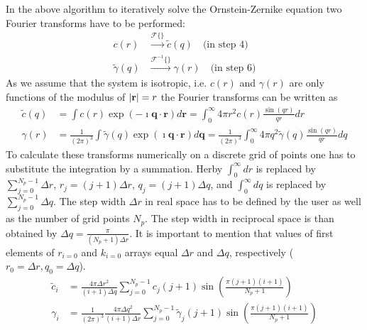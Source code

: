 
In the above algorithm to iteratively solve the Ornstein-Zernike
equation two Fourier transforms have to be performed:
\begin{align}
c(r) & \xrightarrow{\mathscr{F}\{\}} \tilde{c}(q)  \quad \mbox{(in step 4)} \\
\tilde{\gamma}(q) & \xrightarrow{\mathscr{F}^{-1}\{\}} \gamma(r) \quad \mbox{(in step 6)}
\end{align}
As we assume that the system is isotropic, i.e. $c(r)$ and $\gamma(r)$ are only functions
of the modulus of $\abs{\mathbf{r}}=r$ the Fourier transforms can be written as
\begin{align}
\tilde{c}(q) &= \int c(r) \exp\left(- \imath\mathbf{q}\cdot \mathbf{r} \right) d\mathbf{r}
              = \int_0^\infty 4\pi r^2 c(r)              \frac{\sin(qr)}{qr}  dr \\
\gamma(r)    &= \frac{1}{(2\pi)^3}
                \int \tilde{\gamma}(q) \exp\left(\imath\mathbf{q}\cdot \mathbf{r}\right) d\mathbf{q}
              = \frac{1}{(2\pi)^3}
                \int_0^\infty 4\pi q^2 \tilde{\gamma}(q) \frac{\sin(qr)}{qr}  dq
\end{align}
To calculate these transforms numerically on a discrete grid of points
one has to substitute the integration by a summation. Herby $\int_0^\infty dr$ is replaced by
$\sum_{j=0}^{N_p-1} \Delta r$, $r_j=(j+1)\Delta r$, $q_j=(j+1)\Delta q$, and $\int_0^\infty dq$ is replaced by
$\sum_{j=0}^{N_p-1} \Delta q$. The step width $\Delta r$ in real space has to be defined by the user as well
as the number of grid points $N_p$. The step width in reciprocal space is than obtained by
$\Delta q=\frac{\pi}{(N_p+1)\Delta r}$.
It is important to mention that values of first elements of $r_{i=0}$ and $k_{i=0}$ arrays equal $\Delta r$
and $\Delta q$, respectively ($r_0=\Delta r, q_0=\Delta q$).
\begin{align}
\tilde{c}_i &=                   \frac{4\pi \Delta r^2}{(i+1)\Delta q} \sum_{j=0}^{N_p-1}              c_j (j+1) \sin\left(\frac{\pi(j+1)(i+1)}{N_p+1}\right) \\
\gamma_i    &= \frac{1}{(2\pi)^3}\frac{4\pi \Delta q^2}{(i+1)\Delta r} \sum_{j=0}^{N_p-1} \tilde{\gamma}_j (j+1) \sin\left(\frac{\pi(j+1)(i+1)}{N_p+1}\right)
\end{align}

